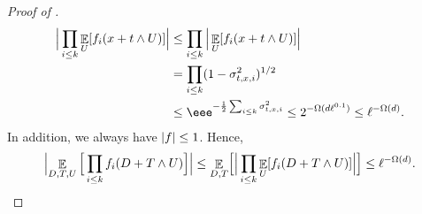 \documentclass{toc}
\def\Blocklength{\ell}
\DeclarePairedDelimiter{\abs}{\lvert}{\rvert}
\DeclareMathOperator*{\E}{\mathbb{E}}                 %
\begin{document}
\begin{proof}[Proof of {}]
    \begin{align*}
      \Big| \prod_{i \le k} \E_{U}[f_i(x + t \wedge U)] \Big| 
      &\le \prod_{i \le k} \Big| \E_{U}[f_i(x + t \wedge U)] \Big| \\
      &= \prod_{i \le k} (1 - \sigma_{t,x,i}^2)^{1/2}  \\
      &\le \eee^{-\frac{1}{2} \sum_{i \le k} \sigma_{t,x,i}^2} \le 2^{-\Omega(d \Blocklength^{0.1})} \le \Blocklength^{-\Omega(d)} .
    \end{align*}
    In addition, we always have $\abs{f} \le 1$.
    Hence,
    \[
      \Bigl| \E_{D,T,U} \Big[ \prod_{i \le k} f_i(D + T \wedge U) \Big] \Bigr|
      \le \E_{D,T} \Bigl[ \Big| \prod_{i \le k} \E_U[f_i(D + T \wedge U)] \Big| \Bigr]
      \le \Blocklength^{-\Omega(d)} .
    \]

    \medskip


\end{proof}
\end{document}
